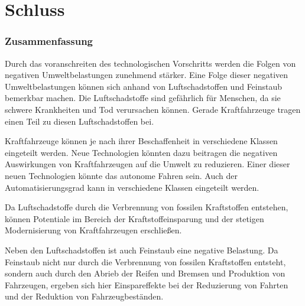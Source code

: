 \chapter{Schluss}

\subsection{Zusammenfassung}
Durch das voranschreiten des technologischen Vorschritts werden die Folgen von negativen Umweltbelastungen zunehmend stärker.
Eine Folge dieser negativen Umweltbelastungen können sich anhand von Luftschadstoffen und Feinstaub bemerkbar machen.
Die Luftschadstoffe sind gefährlich für Menschen, da sie schwere Krankheiten und Tod verursachen können.
Gerade Kraftfahrzeuge tragen einen Teil zu diesen Luftschadstoffen bei.

Kraftfahrzeuge können je nach ihrer Beschaffenheit in verschiedene Klassen eingeteilt werden.
Neue Technologien könnten dazu beitragen die negativen Auswirkungen von Kraftfahrzeugen auf die Umwelt zu reduzieren.
Einer dieser neuen Technologien könnte das autonome Fahren sein.
Auch der Automatisierungsgrad kann in verschiedene Klassen eingeteilt werden.

Da Luftschadstoffe durch die Verbrennung von fossilen Kraftstoffen entstehen,
können Potentiale im Bereich der Kraftstoffeinsparung und der stetigen Modernisierung von Kraftfahrzeugen erschließen.

Neben den Luftschadstoffen ist auch Feinstaub eine negative Belastung.
Da Feinstaub nicht nur durch die Verbrennung von fossilen Kraftstoffen entsteht,
sondern auch durch den Abrieb der Reifen und Bremsen und Produktion von Fahrzeugen,
ergeben sich hier Einspareffekte bei der Reduzierung von Fahrten und der Reduktion von Fahrzeugbeständen.

